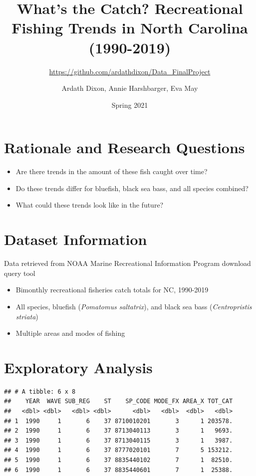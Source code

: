 \documentclass[
  12pt,
]{article}
\title{What's the Catch? Recreational Fishing Trends in North Carolina
(1990-2019)}
\subtitle{\url{https://github.com/ardathdixon/Data_FinalProject}}
\author{Ardath Dixon, Annie Harshbarger, Eva May}
\date{Spring 2021}
\begin{document}
\maketitle

\newpage
\tableofcontents 
\newpage
\listoftables 
\newpage
\listoffigures 
\newpage

\hypertarget{rationale-and-research-questions}{%
\section{Rationale and Research
Questions}\label{rationale-and-research-questions}}

\begin{itemize}
\item
  Are there trends in the amount of these fish caught over time?
\item
  Do these trends differ for bluefish, black sea bass, and all species
  combined?
\item
  What could these trends look like in the future?
\end{itemize}

\newpage

\hypertarget{dataset-information}{%
\section{Dataset Information}\label{dataset-information}}

Data retrieved from NOAA Marine Recreational Information Program
download query tool

\begin{itemize}
\item
  Bimonthly recreational fisheries catch totals for NC, 1990-2019
\item
  All species, bluefish (\emph{Pomatomus saltatrix}), and black sea bass
  (\emph{Centropristis striata})
\item
  Multiple areas and modes of fishing
\end{itemize}

\newpage

\hypertarget{exploratory-analysis}{%
\section{Exploratory Analysis}\label{exploratory-analysis}}

\begin{verbatim}
## # A tibble: 6 x 8
##    YEAR  WAVE SUB_REG    ST    SP_CODE MODE_FX AREA_X TOT_CAT
##   <dbl> <dbl>   <dbl> <dbl>      <dbl>   <dbl>  <dbl>   <dbl>
## 1  1990     1       6    37 8710010201       3      1 203578.
## 2  1990     1       6    37 8713040113       3      1   9693.
## 3  1990     1       6    37 8713040115       3      1   3987.
## 4  1990     1       6    37 8777020101       7      5 153212.
## 5  1990     1       6    37 8835440102       7      1  82510.
## 6  1990     1       6    37 8835440601       7      1  25388.
\end{verbatim}
\end{document}
